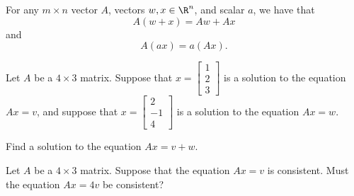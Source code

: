 


\edXsolution{ 
}


\endedxproblem


\endedxvertical










For any $m\times n$ vector $A$, vectors $w,x \in \R^n$, and scalar $a$, we have that 
\[A(w+x) = Aw + Ax\] and
\[A(ax) = a(Ax).\]
  
\endedxtext




Let $A$ be a $4\times 3$ matrix.  Suppose that $x = \left[\begin{array}{c} 1 \\ 2 \\ 3 
\end{array} \right]$ is a solution to the equation $Ax = v$, and suppose that 
$x = \left[\begin{array}{c}  2 \\ -1 \\4
\end{array} \right]$ is a solution to the equation $Ax = w$.  

Find a solution to the equation $Ax = v+w$.  

 



\edXsolution{ 
}


\endedxproblem



Let $A$ be a $4\times 3$ matrix.  Suppose that  the equation $Ax = v$ is consistent.  Must the
equation $Ax = 4v$ be consistent?  


\edXsolution{ 
}


\endedxproblem


\endedxvertical
